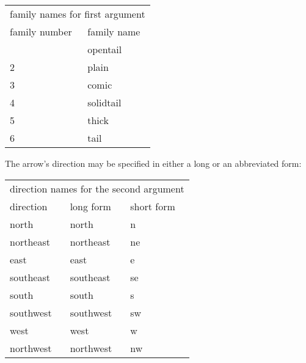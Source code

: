 \documentclass[10pt,british]{article}
\begin{document}
\begin{longtable}{ll}
	\toprule
	\multicolumn{2}{c}{family names for first argument}\\\cmidrule{1-2}
	family number		&	family name\\\midrule
	\endhead
	\bottomrule\endfoot
		1	&	opentail\\
		2	&	plain\\
		3	&	comic\\
		4	&	solidtail\\
		5	&	thick\\
		6	&	tail\\
\end{longtable}

The arrow's direction may be specified in either a long or an abbreviated form:
\begin{longtable}{lll}
	\toprule
	\multicolumn{3}{c}{direction names for the second argument}\\\cmidrule{1-3}
	direction	&	long form		& short form\\\midrule\endhead
	\bottomrule\endfoot
		north			&	north			&	n\\
		northeast	&	northeast	&	ne\\
		east				&	east				&	e\\
		southeast	&	southeast	&	se\\
		south			&	south			&	s\\
		southwest	&	southwest	&	sw\\
		west				&	west				&	w\\
		northwest	&	northwest	&	nw\\
\end{longtable}
\end{document}
